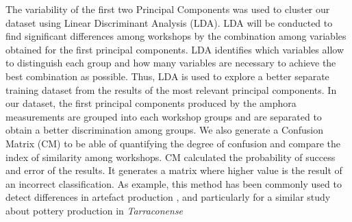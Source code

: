 \documentclass[review]{elsarticle}
\begin{document}
The variability of the first two Principal Components was used to cluster our dataset using Linear Discriminant Analysis (LDA). LDA will be conducted to find significant differences among workshops by the combination among variables obtained for the first principal components. LDA identifies which variables allow to distinguish each group and how many variables are necessary to achieve the best combination as possible. Thus, LDA is used to explore a better separate training dataset from the results of the most relevant principal components. In our dataset, the first principal components produced by the amphora measurements are grouped into each workshop groups and are separated to obtain a better discrimination among groups. 
We also generate a Confusion Matrix (CM) to be able of quantifying the degree of confusion and compare the index of similarity among workshops.  CM calculated the probability of success and error of the results. It generates a matrix where higher value is the result of an incorrect classification. As example, this method has been commonly used to detect differences in artefact production \citep{charlton_investigating_2012, thorpe_distribution_1984}, and particularly for a similar study about pottery production in \emph{Tarraconense} \citep{i_martin_alisis_1998}


\end{document}
